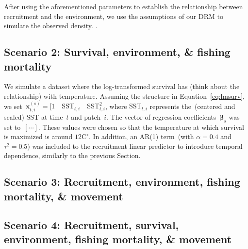 After using the aforementioned parameters to establish the relationship between
recruitment and the environment, we use the assumptions of our DRM to simulate
the observed density. .




\subsection{Scenario 2: Survival, environment, \& fishing mortality}

We simulate a dataset where the log-transformed survival has (think about the
relationship) with temperature. Assuming the structure in
Equation~\eqref{eq:lmsurv}, we
set~$\mathbf{x}^{(s)}_{t, i} = [1 \quad \mathrm{SST}_{t, i} \quad \mathrm{SST}^2_{t,
  i}$, where $\mathrm{SST}_{t, i}$ represents the~(centered and scaled) SST at
time~$t$ and patch~$i$. The vector of regression coefficients~$\mathbf{\beta}_s$ was
set to~$[\cdots]$. These values were chosen so that the temperature at which survival
is maximized is around $12 \mathrm{C}^{\circ}$. In addition, an AR(1) term~(with
$\alpha = 0.4$ and $\tau^2 = 0.5$) was included to the recruitment linear predictor to
introduce temporal dependence, similarly to the previous Section.


\subsection{Scenario 3: Recruitment, environment, fishing mortality, \&
  movement}

\subsection{Scenario 4: Recruitment, survival, environment, fishing mortality,
  \& movement}

